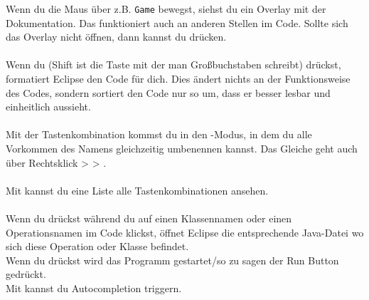 \begin{Infobox}
    Wenn du die Maus über z.B. \lstinline{Game} bewegst, siehst du ein Overlay mit der Dokumentation.
	Das funktioniert auch an anderen Stellen im Code. Sollte sich das Overlay nicht öffnen, dann kannst du  drücken.\\
	\\
	Wenn du  (Shift ist die Taste mit der man Großbuchstaben schreibt) drückst, formatiert Eclipse den Code für dich.
	Dies ändert nichts an der Funktionsweise des Codes, sondern sortiert den Code nur so um, dass er besser lesbar und einheitlich aussieht.\\
	\\
	Mit der Tastenkombination  kommst du in den -Modus, in dem du alle Vorkommen des Namens gleichzeitig umbenennen kannst.
	Das Gleiche geht auch über Rechtsklick >  > .\\
	\\
	Mit  kannst du eine Liste alle Tastenkombinationen ansehen.\\
	\\
	Wenn du  drückst während du auf einen Klassennamen oder einen Operationsnamen im Code klickst, öffnet Eclipse die entsprechende Java-Datei wo sich diese Operation oder Klasse befindet.\\
	Wenn du  drückst wird das Programm gestartet/so zu sagen der Run Button gedrückt.\\
	Mit  kannst du Autocompletion triggern.
\end{Infobox}

\newpage
